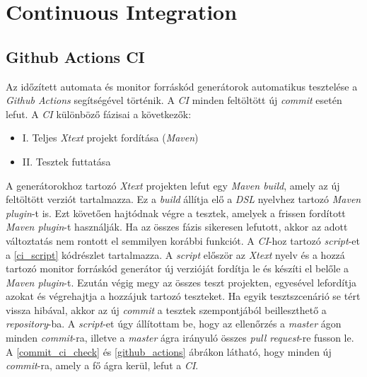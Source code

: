 \clearpage\section{Continuous Integration}\subsection{Github Actions CI}

Az időzített automata és monitor forráskód generátorok automatikus tesztelése a \textit{Github Actions} segítségével történik.
A \textit{CI} minden feltöltött új \textit{commit} esetén lefut.
A \textit{CI} különböző fázisai a következők:

\begin{itemize}
    \item I. Teljes \textit{Xtext} projekt fordítása (\textit{Maven})
    \item II. Tesztek futtatása
\end{itemize}

A generátorokhoz tartozó \textit{Xtext} projekten lefut egy \textit{Maven build}, amely az új feltöltött verziót tartalmazza.
Ez a \textit{build} állítja elő a \textit{DSL} nyelvhez tartozó \textit{Maven plugin}-t is.
Ezt követően hajtódnak végre a tesztek, amelyek a frissen fordított \textit{Maven plugin}-t használják.
Ha az összes fázis sikeresen lefutott, akkor az adott változtatás nem rontott el semmilyen korábbi funkciót.
A \textit{CI}-hoz tartozó \textit{script}-et a \ref{ci_script} kódrészlet tartalmazza.
A \textit{script} először az \textit{Xtext} nyelv és a hozzá tartozó monitor forráskód generátor új verzióját fordítja le és készíti el belőle a \textit{Maven plugin}-t.
Ezután végig megy az összes teszt projekten, egyesével lefordítja azokat és végrehajtja a hozzájuk tartozó teszteket.
Ha egyik tesztszcenárió se tért vissza hibával, akkor az új \textit{commit} a tesztek szempontjából beilleszthető a \textit{repository}-ba.
A \textit{script}-et úgy állítottam be, hogy az ellenőrzés a \textit{master} ágon minden \textit{commit}-ra, illetve a \textit{master} ágra irányuló összes \textit{pull request}-re fusson le.
A \ref{commit_ci_check} és \ref{github_actions} ábrákon látható, hogy minden új \textit{commit}-ra, amely a fő ágra kerül, lefut a \textit{CI}.

